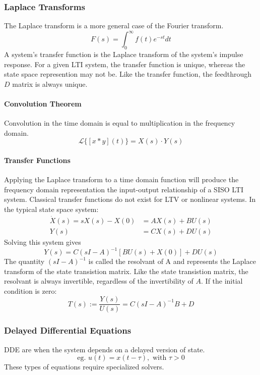 \documentclass[../notes.tex]{subfiles}
\begin{document}
\subsubsection{Laplace Transforms}
The Laplace transform is a more general case of the Fourier transform.
\begin{equation}
    F(s) = \int_{0}^{\infty}f(t)e^{-st}dt
\end{equation}
A system's transfer function is the Laplace transform of the system's impulse response. For a given LTI system, the transfer function is unique, whereas the state space represention may not be. Like the transfer function, the feedthrough $D$ matrix is always unique.

\paragraph{Convolution Theorem}
Convolution in the time domain is equal to multiplication in the frequency domain.
\begin{equation}
    \mathcal{L}\{[x * y](t)\} = X(s) \cdot Y(s)
\end{equation}

\paragraph{Transfer Functions} \label{sec:transfer_func}
Applying the Laplace transform to a time domain function will produce the frequency domain representation the input-output relationship of a SISO LTI system. Classical transfer functions do not exist for LTV or nonlinear systems. In the typical state space system:
\begin{align*}
    \dot{X}(s) = sX(s) - X(0) &= AX(s) + BU(s) \\
    Y(s) &= CX(s) + DU(s)
\end{align*}
Solving this system gives 
\begin{equation}
    Y(s) = C(sI-A)^{-1}[BU(s) + X(0)] + DU(s)
\end{equation}
The quantity $(sI-A)^{-1}$ is called the resolvant of A and represents the Laplace transform of the state transistion matrix. Like the state transistion matrix, the resolvant is always invertible, regardless of the invertibility of $A$. If the initial condition is zero:
\begin{equation}
    T(s) := \frac{Y(s)}{U(s)} = C(sI-A)^{-1}B+D
\end{equation}

\subsubsection{Delayed Differential Equations}
DDE are when the system depends on a delayed version of state.
\begin{equation}
    \text{eg. }u(t) = x(t-\tau), \text{ with } \tau > 0
\end{equation}
These types of equations require specialized solvers.
\end{document}
